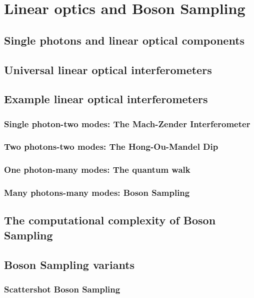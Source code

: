 \section{Linear optics and Boson Sampling}

\subsection{Single photons and linear optical components}

\subsection{Universal linear optical interferometers}

\subsection{Example linear optical interferometers}

\subsubsection{Single photon-two modes: The Mach-Zender Interferometer}

\subsubsection{Two photons-two modes: The Hong-Ou-Mandel Dip}

\subsubsection{One photon-many modes: The quantum walk}

\subsubsection{Many photons-many modes: Boson Sampling}

\subsection{The computational complexity of Boson Sampling}

\subsection{Boson Sampling variants}

\subsubsection{Scattershot Boson Sampling}

